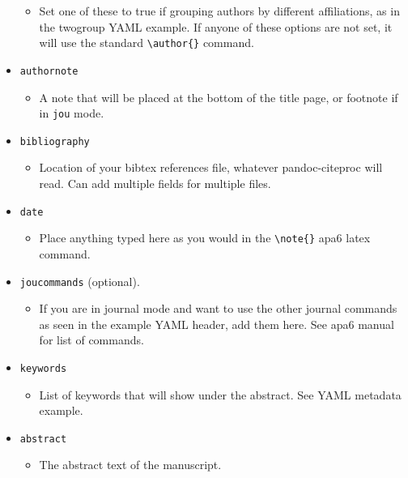 \documentclass[doc,longtable]{apa6}
\let\tightlist\relax %
\begin{document}
\begin{itemize}
  \begin{itemize}
  \tightlist
  \item
    Set one of these to true if grouping authors by different affiliations, as in the twogroup YAML example. If anyone of these options are not set, it will use the standard \texttt{\textbackslash{}author\{\}} command.
  \end{itemize}
\item
  \texttt{authornote}

  \begin{itemize}
  \tightlist
  \item
    A note that will be placed at the bottom of the title page, or footnote if in \texttt{jou} mode.
  \end{itemize}
\item
  \texttt{bibliography}

  \begin{itemize}
  \tightlist
  \item
    Location of your bibtex references file, whatever pandoc-citeproc will read. Can add multiple fields for multiple files.
  \end{itemize}
\item
  \texttt{date}

  \begin{itemize}
  \tightlist
  \item
    Place anything typed here as you would in the \texttt{\textbackslash{}note\{\}} apa6 latex command.
  \end{itemize}
\item
  \texttt{joucommands} (optional).

  \begin{itemize}
  \tightlist
  \item
    If you are in journal mode and want to use the other journal commands as seen in the example YAML header, add them here. See apa6 manual for list of commands.
  \end{itemize}
\item
  \texttt{keywords}

  \begin{itemize}
  \tightlist
  \item
    List of keywords that will show under the abstract. See YAML metadata example.
  \end{itemize}
\item
  \texttt{abstract}

  \begin{itemize}
  \tightlist
  \item
    The abstract text of the manuscript.
  \end{itemize}
\end{itemize}
\end{document}
